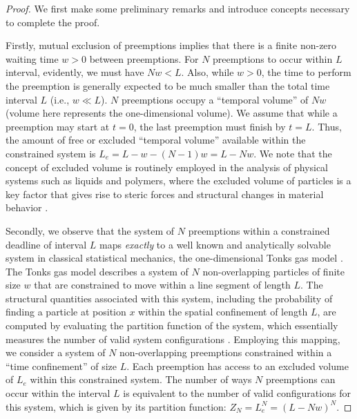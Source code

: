 \begin{proof} 
We first make some preliminary remarks and introduce concepts necessary to complete the proof. 

Firstly, mutual exclusion of preemptions implies that there is a finite non-zero waiting time $w>0$ between preemptions. 
For $N$ preemptions to occur within $L$ interval, evidently, we must have $N w < L$. Also, while $w >0$, the time to perform the preemption is generally expected to be much smaller than the total time interval $L$ (i.e., $w \ll L$).
$N$ preemptions occupy a ``temporal volume'' of $Nw$ (volume here represents the one-dimensional volume). We assume that while a preemption may start at $t=0$, the last preemption must finish by $t = L$. Thus, the amount of free or excluded ``temporal volume'' available within the constrained system is $L_e = L - w - (N-1)w = L - Nw$.
We note that the concept of excluded volume is routinely employed in the analysis of physical systems such as liquids and polymers, where the excluded volume of particles is a key factor that gives rise to steric forces and structural changes in material behavior \cite{krauth2006statistical,jing2015ionic,anousheh2020ionic}. 

Secondly, we observe that the system of $N$ preemptions within a constrained deadline of interval $L$ maps \emph{exactly} to a well known and analytically solvable system in classical statistical mechanics, the one-dimensional Tonks gas model \cite{tonks}. The Tonks gas model describes a system of $N$ non-overlapping particles of finite size $w$ that are constrained to move within a line segment of length $L$. The structural quantities associated with this system, including the probability of finding a particle at position $x$ within the spatial confinement of length $L$, are computed by evaluating the partition function of the system, which essentially measures the number of valid system configurations \cite{krauth2006statistical}. 
Employing this mapping, we consider a system of $N$ non-overlapping preemptions constrained within a ``time confinement'' of size $L$. Each preemption has access to an excluded volume of $L_e$ within this constrained system. 
The number of ways $N$ preemptions can occur within the interval $L$ is equivalent to the number of valid configurations for this system, which is given by its partition function: $Z_N = L_e^N = (L- Nw)^N$.


\end{proof}
